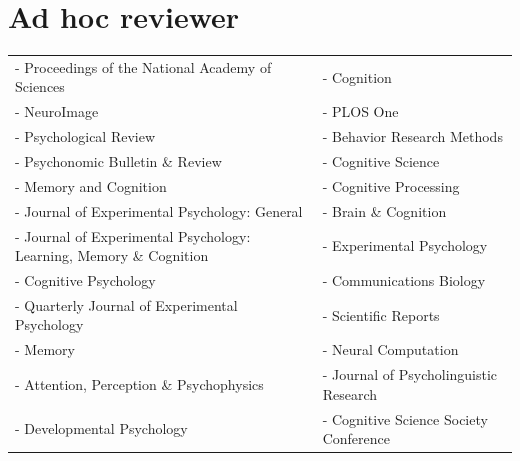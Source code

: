 \documentclass[letterpaper]{article}
\begin{document}
\section*{Ad hoc reviewer}

\begin{longtable}{p{}p{}}
  - Proceedings of the National Academy of Sciences                   & - Cognition                            \\
  - NeuroImage                                                        & - PLOS One                             \\
  - Psychological Review                                              & - Behavior Research Methods            \\
  - Psychonomic Bulletin \& Review                                    & - Cognitive Science                    \\
  - Memory and Cognition                                              & - Cognitive Processing                 \\
  - Journal of Experimental Psychology: General                       & - Brain \& Cognition                   \\
  - Journal of Experimental Psychology: Learning, Memory \& Cognition & - Experimental Psychology              \\
  - Cognitive Psychology                                              & - Communications Biology               \\
  - Quarterly Journal of Experimental Psychology                      & - Scientific Reports                   \\
  - Memory                                                            & - Neural Computation                   \\
  - Attention, Perception \& Psychophysics                            & - Journal of Psycholinguistic Research \\
  - Developmental Psychology                                          & - Cognitive Science Society Conference \\
\end{longtable}

\bigskip
\end{document}
